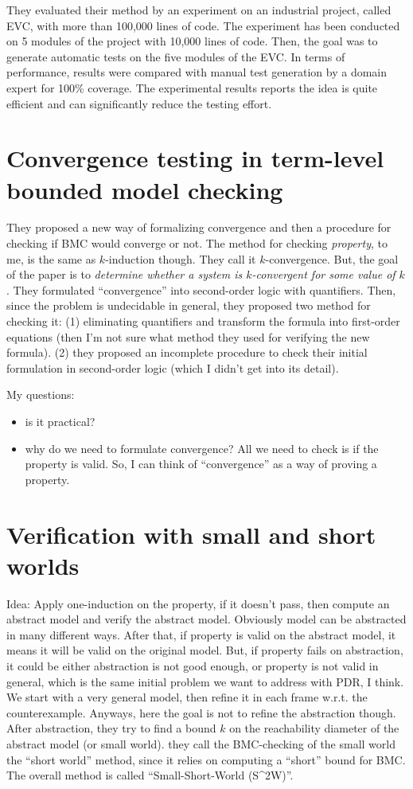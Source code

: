 They evaluated their method by an experiment on an industrial project, called EVC, with more than 100,000 lines of code. The experiment has been conducted on 5 modules of the project with 10,000 lines of code.  Then, the goal was to generate automatic
tests on the five modules of the EVC.
In terms of performance, results were compared
with manual test generation by a domain expert for 100\% coverage. The experimental results reports the idea is quite efficient and
can significantly reduce the testing effort.

\section{Convergence testing in term-level bounded model checking \cite{bryant2003convergence}}
They proposed a new way of formalizing convergence and 
then a procedure for checking if BMC would converge or not. 
The method for checking \emph{property}, to me, is the same as $k$-induction though. 
They call it $k$-convergence. But, the goal of the paper is to \emph{determine whether a system is $k$-convergent for some
value of $k$}. They formulated ``convergence'' into second-order logic with quantifiers. 
Then, since the problem is undecidable in general, they proposed two method for checking it: 
(1) eliminating quantifiers and transform the formula into 
first-order equations (then I'm not sure what method they used for verifying the new formula). 
(2) they proposed an incomplete procedure to check their initial formulation in second-order logic (which I didn't get into its detail).

My questions:
\begin{itemize}
  \item is it practical? 
  \item why do we need to formulate convergence? 
  All we need to check is if the property is valid. 
  So, I can think of ``convergence'' as a way of proving a property. 
\end{itemize}

\section{Verification with small and short worlds \cite{sinha2012verification}}
Idea: Apply one-induction on the property, if it doesn't pass, 
then compute an abstract model and verify the abstract model.
Obviously model can be abstracted in many different ways. After that, if property is valid on the abstract model, it means it will be valid on the original model. But, if property fails on abstraction, it could be either abstraction is not good enough, or property is not valid in general, which is the same initial problem we want to address with PDR, I think. We start with a very general model, then refine it in each frame w.r.t. the counterexample. Anyways, here the goal is not to refine the abstraction though. After abstraction, they  try  to  find  a  bound
$k$ on  the  reachability  diameter  of  the abstract model (or  small  world).  
they call the BMC-checking of the small world the
“short world” method, since it relies on computing a ``short''
bound  for  BMC.   The overall method is called ``Small-Short-World (S^2W)''.

